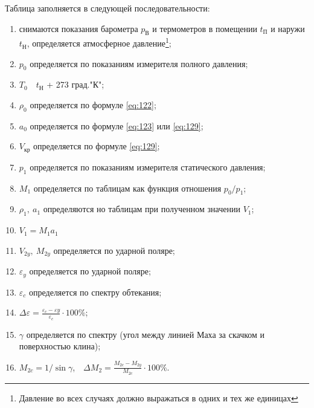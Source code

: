\documentclass[specialist, subf, href, colorlinks=true, 14pt, final]{disser}
\theoremstyle{definition}
\begin{document}
Таблица заполняется в следующей последовательности:
\begin{enumerate}
  \item снимаются показания барометра $p_{\text{В}}$ и термометров в помещении $t_{\text{П}}$ и наружи $t_{\text{Н}}$, определяется атмосферное давление\footnote{Давление во всех случаях должно выражаться в одних и тех же единицах};
  \item $p_0$ определяется по показаниям измерителя полного давления;
  \item $T_0$\ \ $t_{\text{Н}}$ + 273 град."К";
  \item $\rho_0$ определяется по формуле \eqref{eq:122};
  \item $a_0$ определяется по формуле \eqref{eq:123} или \eqref{eq:129};
  \item $V_{\text{кр}}$ определяется по формуле \eqref{eq:129};
  \item $p_1$ определяется по показаниям измерителя статического давления;
  \item $M_1$ определяется по таблицам как функция отношения $p_{0}/p_{1}$;
  \item $\rho_{1},\ a_{1}$ определяются но таблицам при полученном значении $V_1$;
  \item $V_{1} = M_{1}a_{1}$
  \item $V_{2y},\ M_{2y}$ определяется по ударной поляре;
  \item $\varepsilon_{y}$ определяется по ударной поляре;
  \item $\varepsilon_{c}$ определяется по спектру обтекания;
  \item {\large$\Delta\varepsilon = \frac{\varepsilon_{c}-\varepsilon{y}}{\varepsilon_{c}}\cdot 100\%$};
  \item $\gamma$ определяется по спектру (угол между линией Маха за скачком и поверхностью клина);
  \item {\large $M_{2c} = 1/\sin\gamma$,\ \ $\Delta M_{2} = \frac{M_{2c}-M_{2y}}{M_{2c}}\cdot 100\%$.}\\
\end{enumerate}
\end{document}
